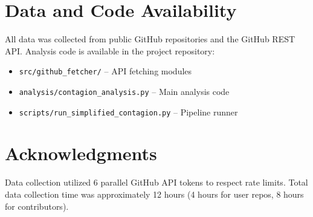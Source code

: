 \documentclass[11pt]{article}
\begin{document}
\section*{Data and Code Availability}

All data was collected from public GitHub repositories and the GitHub REST API. Analysis code is available in the project repository:

\begin{itemize}
    \item \texttt{src/github\_fetcher/} -- API fetching modules
    \item \texttt{analysis/contagion\_analysis.py} -- Main analysis code
    \item \texttt{scripts/run\_simplified\_contagion.py} -- Pipeline runner
\end{itemize}

\section*{Acknowledgments}

Data collection utilized 6 parallel GitHub API tokens to respect rate limits. Total data collection time was approximately 12 hours (4 hours for user repos, 8 hours for contributors).
\end{document}
